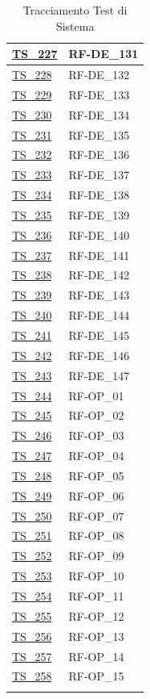 \begin{longtable}{|
		>{\raggedright\arraybackslash}p{} |
		>{\centering\arraybackslash}p{} |
	}
	\hyperlink{ts-227}{TS\_227} & RF-DE\_131 \\ \hline
	\hyperlink{ts-228}{TS\_228} & RF-DE\_132 \\ \hline
	\hyperlink{ts-229}{TS\_229} & RF-DE\_133 \\ \hline
	\hyperlink{ts-230}{TS\_230} & RF-DE\_134 \\ \hline
	\hyperlink{ts-231}{TS\_231} & RF-DE\_135 \\ \hline
	\hyperlink{ts-232}{TS\_232} & RF-DE\_136 \\ \hline
	\hyperlink{ts-233}{TS\_233} & RF-DE\_137 \\ \hline
	\hyperlink{ts-234}{TS\_234} & RF-DE\_138 \\ \hline
	\hyperlink{ts-235}{TS\_235} & RF-DE\_139 \\ \hline
	\hyperlink{ts-236}{TS\_236} & RF-DE\_140 \\ \hline
	\hyperlink{ts-237}{TS\_237} & RF-DE\_141 \\ \hline
	\hyperlink{ts-238}{TS\_238} & RF-DE\_142 \\ \hline
	\hyperlink{ts-239}{TS\_239} & RF-DE\_143 \\ \hline
	\hyperlink{ts-240}{TS\_240} & RF-DE\_144 \\ \hline
	\hyperlink{ts-241}{TS\_241} & RF-DE\_145 \\ \hline
	\hyperlink{ts-242}{TS\_242} & RF-DE\_146 \\ \hline
	\hyperlink{ts-243}{TS\_243} & RF-DE\_147 \\ \hline
	\hyperlink{ts-244}{TS\_244} & RF-OP\_01 \\ \hline
	\hyperlink{ts-245}{TS\_245} & RF-OP\_02 \\ \hline
	\hyperlink{ts-246}{TS\_246} & RF-OP\_03 \\ \hline
	\hyperlink{ts-247}{TS\_247} & RF-OP\_04 \\ \hline
	\hyperlink{ts-248}{TS\_248} & RF-OP\_05 \\ \hline
	\hyperlink{ts-249}{TS\_249} & RF-OP\_06 \\ \hline
	\hyperlink{ts-250}{TS\_250} & RF-OP\_07 \\ \hline
	\hyperlink{ts-251}{TS\_251} & RF-OP\_08 \\ \hline
	\hyperlink{ts-252}{TS\_252} & RF-OP\_09 \\ \hline
	\hyperlink{ts-253}{TS\_253} & RF-OP\_10 \\ \hline
	\hyperlink{ts-254}{TS\_254} & RF-OP\_11 \\ \hline
	\hyperlink{ts-255}{TS\_255} & RF-OP\_12 \\ \hline
	\hyperlink{ts-256}{TS\_256} & RF-OP\_13 \\ \hline
	\hyperlink{ts-257}{TS\_257} & RF-OP\_14 \\ \hline
	\hyperlink{ts-258}{TS\_258} & RF-OP\_15 \\ \hline
	
	\caption{Tracciamento Test di Sistema}
\end{longtable}